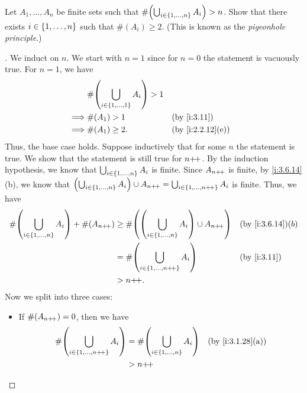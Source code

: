 \begin{ex}\label{i:ex:3.6.10}
  Let \(A_1, \dots, A_n\) be finite sets such that \(\#\pa{\bigcup_{i \in \set{1, \dots, n}} A_i} > n\).
  Show that there exists \(i \in \left\lbrace1, \dots, n\right\rbrace\) such that \(\#(A_i) \geq 2\).
  (This is known as the \emph{pigeonhole principle}.)
\end{ex}

\begin{proof}[]
  We induct on \(n\).
  We start with \(n = 1\) since for \(n = 0\) the statement is vacuously true.
  For \(n = 1\), we have
  \begin{align*}
             & \#\pa{\bigcup_{i \in \set{1, \dots, 1}} A_i} > 1                       \\
    \implies & \#(A_1) > 1                                      &  & \by{i:3.11}      \\
    \implies & \#(A_1) \geq 2.                                  &  & \by{i:2.2.12}[e]
  \end{align*}
  Thus, the base case holds.
  Suppose inductively that for some \(n\) the statement is true.
  We show that the statement is still true for \(n{+}\!{+}\).
  By the induction hypothesis, we know that \(\bigcup_{i \in \left\lbrace1, \dots, n\right\rbrace} A_i\) is finite.
  Since \(A_{n{+}\!{+}}\) is finite, by \cref{i:3.6.14}(b), we know that \(\left\lparen\bigcup_{i \in \left\lbrace1, \dots, n\right\rbrace} A_i\right\rparen \cup A_{n{+}\!{+}} = \bigcup_{i \in \left\lbrace1, \dots, n{+}\!{+}\right\rbrace} A_i\) is finite.
  Thus, we have
  \begin{align*}
    \#\pa{\bigcup_{i \in \set{1, \dots, n}} A_i} + \#(A_{n\pp}) & \geq \#\pa{\pa{\bigcup_{i \in \set{1, \dots, n}} A_i} \cup A_{n\pp}} &  & \by{i:3.6.14}(b) \\
                                                                & = \#\pa{\bigcup_{i \in \set{1, \dots, n\pp}} A_i}                    &  & \by{i:3.11}      \\
                                                                & > n\pp.
  \end{align*}
  Now we split into three cases:
  \begin{itemize}
    \item If \(\#(A_{n{+}\!{+}}) = 0\), then we have
          \begin{align*}
            \#\pa{\bigcup_{i \in \set{1, \dots, n\pp}} A_i} & = \#\pa{\bigcup_{i \in \set{1, \dots, n}} A_i} &  & \by{i:3.1.28}[a] \\
                                                            & > n\pp                                                               \\

\end{align*}
\end{itemize}
\end{proof}
